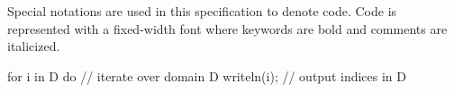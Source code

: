 \label{Notation}

Special notations are used in this specification to denote code.  
Code is represented with a fixed-width font where keywords are
bold and comments are italicized.
\begin{example}
\begin{chapel}
for i in D do   // iterate over domain D
  writeln(i);   // output indices in D
\end{chapel}
\end{example}
